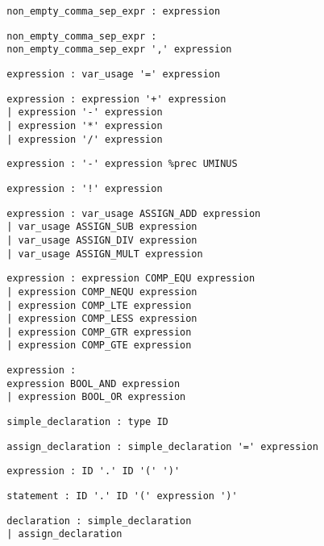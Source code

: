 \documentclass[10pt,landscape]{article}
\begin{document}
\begin{multicols}{3}
\begin{verbatim}
		non_empty_comma_sep_expr : expression
		\end{verbatim}
		\begin{verbatim}
		non_empty_comma_sep_expr :
		non_empty_comma_sep_expr ',' expression
		\end{verbatim}
		\begin{verbatim}
		expression : var_usage '=' expression
		\end{verbatim}
		\begin{verbatim}
		expression : expression '+' expression
		| expression '-' expression
		| expression '*' expression
		| expression '/' expression
		\end{verbatim}
		\begin{verbatim}
		expression : '-' expression %prec UMINUS
		\end{verbatim}
		\begin{verbatim}
		expression : '!' expression
		\end{verbatim}
		\begin{verbatim}
		expression : var_usage ASSIGN_ADD expression
		| var_usage ASSIGN_SUB expression
		| var_usage ASSIGN_DIV expression
		| var_usage ASSIGN_MULT expression
		\end{verbatim}
		\begin{verbatim}
		expression : expression COMP_EQU expression
		| expression COMP_NEQU expression
		| expression COMP_LTE expression
		| expression COMP_LESS expression
		| expression COMP_GTR expression
		| expression COMP_GTE expression
		\end{verbatim}
		\begin{verbatim}
		expression : 
		expression BOOL_AND expression
		| expression BOOL_OR expression
		\end{verbatim}
		\begin{verbatim}
		simple_declaration : type ID
		\end{verbatim}
		\begin{verbatim}
		assign_declaration : simple_declaration '=' expression
		\end{verbatim}
		\begin{verbatim}
		expression : ID '.' ID '(' ')'
		\end{verbatim}
		\begin{verbatim}
		statement : ID '.' ID '(' expression ')'
		\end{verbatim}
		\begin{verbatim}
		declaration : simple_declaration
		| assign_declaration
		\end{verbatim}

\end{multicols}
\end{document}
